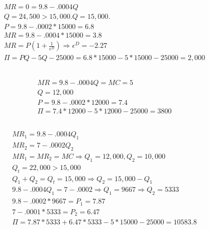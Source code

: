 \documentclass{article}
\begin{document}
\section[9]{}
	\subsection[a]{}
		\begin{align*}
			MR = 0 = 9.8-.0004Q\\
			Q = 24,500 > 15,000. Q = 15,000. \\
			P = 9.8-.0002*15000 = 6.8 \\
			MR = 9.8 - .0004*15000 = 3.8\\
			MR = P\left ( 1+ \frac{1}{\epsilon^D} \right ) \Rightarrow \epsilon^D = -2.27\\
			\Pi = PQ-5Q-25000 = 6.8*15000-5*15000-25000=2,000			
		\end{align*}	
	\subsection[b]{}
		\begin{align*}
			MR = 9.8-.0004Q = MC = 5\\
			Q = 12,000\\
			P=9.8-.0002*12000=7.4\\
			\Pi = 7.4*12000-5*12000-25000=3800
		\end{align*}
	\subsection[c]{}
		\begin{align*}
			MR_1 = 9.8-.0004Q_1\\
			MR_2 = 7-.0002Q_2\\
			MR_1 = MR_2 = MC \Rightarrow Q_1 = 12,000, Q_2 = 10,000\\
			Q_t =22,000 > 15,000 \\
			Q_1 + Q_2 = Q_t = 15,000 \Rightarrow Q_2 = 15,000 - Q_1 \\
			9.8-.0004Q_1 = 7-.0002 \Rightarrow Q_1 =9667 \Rightarrow Q_2 = 5333\\
			9.8-.0002*9667 = P_1 = 7.87\\
			7-.0001*5333 = P_2 = 6.47\\
			\Pi = 7.87*5333+6.47*5333-5*15000-25000 = 10583.8				
		\end{align*}								 			
				
		
				 	
							
															
				
\end{document}
